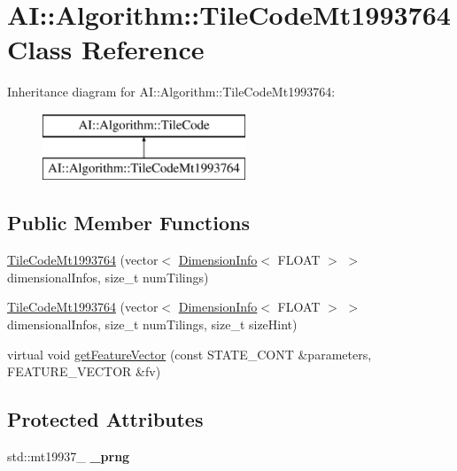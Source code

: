 \hypertarget{classAI_1_1Algorithm_1_1TileCodeMt1993764}{\section{A\-I\-:\-:Algorithm\-:\-:Tile\-Code\-Mt1993764 Class Reference}
\label{classAI_1_1Algorithm_1_1TileCodeMt1993764}
}
Inheritance diagram for A\-I\-:\-:Algorithm\-:\-:Tile\-Code\-Mt1993764\-:\begin{figure}[H]
\begin{center}
\leavevmode
\includegraphics[height=2.000000cm]{classAI_1_1Algorithm_1_1TileCodeMt1993764}
\end{center}
\end{figure}
\subsection*{Public Member Functions}
\begin{DoxyCompactItemize}
\item 
\hyperlink{classAI_1_1Algorithm_1_1TileCodeMt1993764_a0d8eee3e74ccf5587d1f376e9c54a33f}{Tile\-Code\-Mt1993764} (vector$<$ \hyperlink{classAI_1_1Algorithm_1_1DimensionInfo}{Dimension\-Info}$<$ F\-L\-O\-A\-T $>$ $>$ dimensional\-Infos, size\-\_\-t num\-Tilings)
\item 
\hyperlink{classAI_1_1Algorithm_1_1TileCodeMt1993764_a6062251f25cab695518db0fda5f97dc6}{Tile\-Code\-Mt1993764} (vector$<$ \hyperlink{classAI_1_1Algorithm_1_1DimensionInfo}{Dimension\-Info}$<$ F\-L\-O\-A\-T $>$ $>$ dimensional\-Infos, size\-\_\-t num\-Tilings, size\-\_\-t size\-Hint)
\item 
virtual void \hyperlink{classAI_1_1Algorithm_1_1TileCodeMt1993764_a8d3e8fd183947d9dcb19e63139ea0871}{get\-Feature\-Vector} (const S\-T\-A\-T\-E\-\_\-\-C\-O\-N\-T \&parameters, F\-E\-A\-T\-U\-R\-E\-\_\-\-V\-E\-C\-T\-O\-R \&fv)
\end{DoxyCompactItemize}
\subsection*{Protected Attributes}
\begin{DoxyCompactItemize}
\item 
\hypertarget{classAI_1_1Algorithm_1_1TileCodeMt1993764_a2b2f796c8f67e2076c1149c9d5e43be9}{std\-::mt19937\-\_ {\bfseries \-\_\-prng}}\label{classAI_1_1Algorithm_1_1TileCodeMt1993764_a2b2f796c8f67e2076c1149c9d5e43be9}

\end{DoxyCompactItemize}
